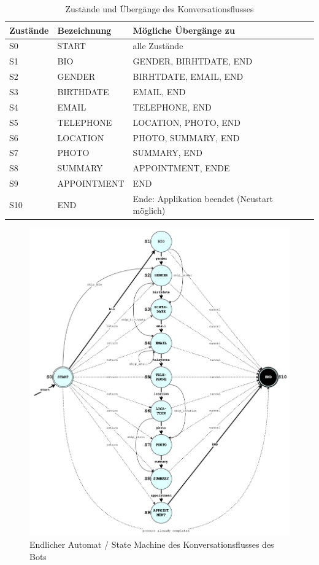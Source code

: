 	\label{states table}
	\begin{table} %
		\centering
		\begin{tabular}{l | l l l l}
			\textbf{Zustände} 	&		\textbf{Bezeichnung}	&		\textbf{Mögliche Übergänge zu}\\
			\hline
			S0 					&		START 					&		alle Zustände\\
			S1 					&		BIO 					&		GENDER, BIRHTDATE, END\\
			S2 					&		GENDER 					&		BIRHTDATE, EMAIL, END\\
			S3 					&		BIRTHDATE 				&		EMAIL, END\\
			S4 					&		EMAIL 					&		TELEPHONE, END\\
			S5 					&		TELEPHONE 				&		LOCATION, PHOTO, END\\
			S6 					&		LOCATION 				&		PHOTO, SUMMARY, END\\
			S7 					&		PHOTO 					&		SUMMARY, END\\
			S8 					&		SUMMARY 				&		APPOINTMENT, ENDE\\
			S9 					&		APPOINTMENT				&		END\\
			S10 				&		END 					&		Ende: Applikation beendet (Neustart möglich)\\
			
		\end{tabular}
		\caption{Zustände und Übergänge des Konversationsflusses}
		\label{tab: states}
	\end{table}
	
	\begin{figure} %
		\centering
		\includegraphics[width=1.0\textwidth]{images/220328_PA28464_State-Machine.png}
		\caption{Endlicher Automat / State Machine des Konversationsflusses des Bots}
		\label{fig: state machine}
	\end{figure}
	